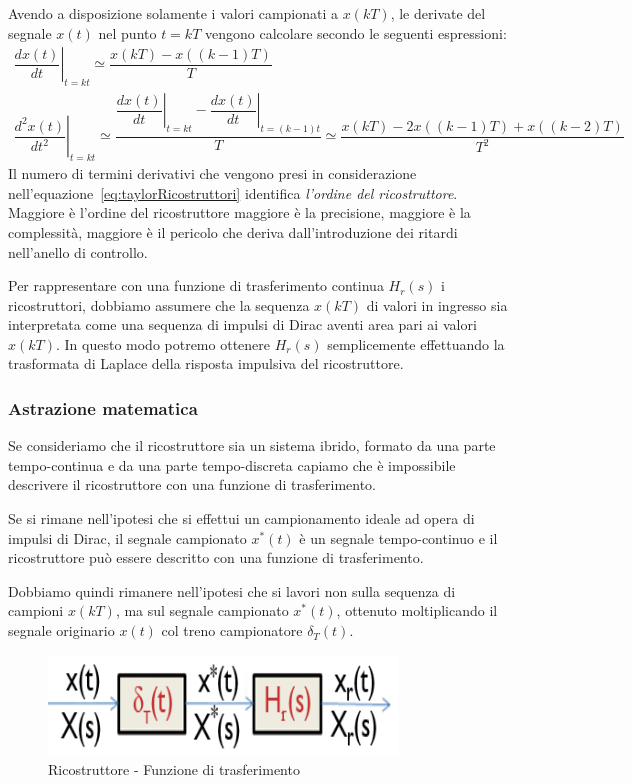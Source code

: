 \documentclass[a4paper]{report}
\begin{document}
Avendo a disposizione solamente i valori campionati a $x(kT)$, le
derivate del segnale $x(t)$ nel punto $t = kT$ vengono calcolare
secondo le seguenti espressioni:
\[
\begin{array}{l}
\left. \dfrac{dx(t)}{dt}\right|_{t = kt} \simeq \dfrac{x(kT) - x((k -
  1)T)}{T}\\

\left. \dfrac{d^2x(t)}{dt^2}\right|_{t = kt} \simeq
\dfrac{\left. \dfrac{dx(t)}{dt}\right|_{t = kt} -
  \left. \dfrac{dx(t)}{dt}\right|_{t = (k - 1)t}}{T} \simeq
\dfrac{x(kT) - 2x((k - 1)T) + x((k - 2)T)}{T^2}
\end{array}
\]
Il numero di termini derivativi che vengono presi in considerazione
nell'equazione~\ref{eq:taylorRicostruttori} identifica {\em l'ordine
  del ricostruttore}. Maggiore \`e l'ordine del ricostruttore
maggiore \`e la precisione, maggiore \`e la complessit\`a, maggiore
\`e il pericolo che deriva dall'introduzione dei ritardi nell'anello
di controllo. 

Per rappresentare con una funzione di trasferimento continua $H_r(s)$
i ricostruttori, dobbiamo assumere che la sequenza $x(kT)$ di valori
in ingresso sia interpretata come una sequenza di impulsi di Dirac
aventi area pari ai valori $x(kT)$. In questo modo potremo ottenere
$H_r(s)$ semplicemente effettuando la trasformata di Laplace della
risposta impulsiva del ricostruttore.

\subsubsection{Astrazione matematica}\label{astrazioneMatematica}
Se consideriamo che il ricostruttore sia un sistema ibrido, formato da
una parte tempo-continua e da una parte tempo-discreta capiamo che \`e
impossibile descrivere il ricostruttore con una funzione di
trasferimento.

Se si rimane nell'ipotesi che si effettui un campionamento ideale ad
opera di impulsi di Dirac, il segnale campionato $x^{*}(t)$ \`e un
segnale tempo-continuo e il ricostruttore pu\`o essere descritto con
una funzione di trasferimento.

Dobbiamo quindi rimanere nell'ipotesi che si lavori non sulla sequenza
di campioni $x(kT)$, ma sul segnale campionato $x^{*}(t)$, ottenuto
moltiplicando il segnale originario $x(t)$ col treno campionatore
$\delta_T(t)$.
\begin{figure}[!h]
  \begin{center}
    \includegraphics[scale=0.5]{./figures/astrazioneMatematica.png}
    \caption{Ricostruttore - Funzione di
      trasferimento}\label{fig:astrazioneMatematica} 
  \end{center}
\end{figure}
\end{document}

